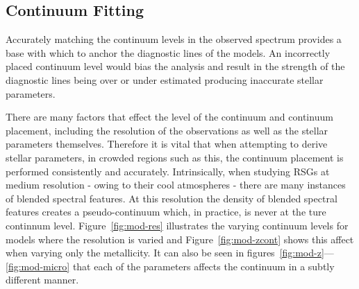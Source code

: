 \subsection{Continuum Fitting} %
\label{sub:continuum_fitting}

Accurately matching the continuum levels in the observed
spectrum provides a base with which to anchor the diagnostic lines of the models.
An incorrectly placed continuum level would bias the analysis and result in the
strength of the diagnostic lines being over or under estimated producing inaccurate stellar parameters.

There are many factors that effect the level of the continuum and continuum placement,
including the resolution of the observations as well as the stellar parameters themselves.
Therefore it is vital that when attempting to derive stellar parameters,
in crowded regions such as this, the continuum placement is performed
consistently and accurately.
Intrinsically, when studying RSGs at medium resolution - owing  to their cool atmospheres -
there are many instances of blended spectral features.
At this resolution the density of blended spectral features creates a pseudo-continuum which, in practice,
is never at the ture continnum level.
Figure~\ref{fig:mod-res} illustrates the varying continuum levels for models where the resolution is varied and
Figure~\ref{fig:mod-zcont} shows this affect when varying only the metallicity.
It can also be seen in figures~\ref{fig:mod-z}---\ref{fig:mod-micro} that each of the parameters affects the continuum in a subtly different manner.

